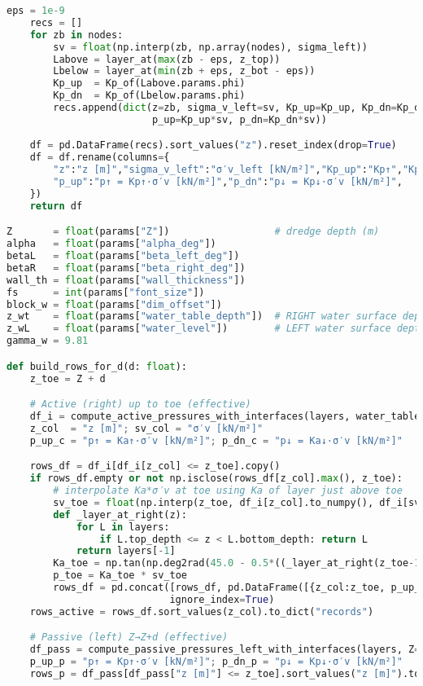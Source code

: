 \begin{lstlisting}[language=Python]
    eps = 1e-9
    recs = []
    for zb in nodes:
        sv = float(np.interp(zb, np.array(nodes), sigma_left))
        Labove = layer_at(max(zb - eps, z_top))
        Lbelow = layer_at(min(zb + eps, z_bot - eps))
        Kp_up  = Kp_of(Labove.params.phi)
        Kp_dn  = Kp_of(Lbelow.params.phi)
        recs.append(dict(z=zb, sigma_v_left=sv, Kp_up=Kp_up, Kp_dn=Kp_dn,
                         p_up=Kp_up*sv, p_dn=Kp_dn*sv))

    df = pd.DataFrame(recs).sort_values("z").reset_index(drop=True)
    df = df.rename(columns={
        "z":"z [m]","sigma_v_left":"σ′v_left [kN/m²]","Kp_up":"Kp↑","Kp_dn":"Kp↓",
        "p_up":"p↑ = Kp↑·σ′v [kN/m²]","p_dn":"p↓ = Kp↓·σ′v [kN/m²]",
    })
    return df

Z       = float(params["Z"])                  # dredge depth (m)
alpha   = float(params["alpha_deg"])
betaL   = float(params["beta_left_deg"])
betaR   = float(params["beta_right_deg"])
wall_th = float(params["wall_thickness"])
fs      = int(params["font_size"])
block_w = float(params["dim_offset"])
z_wt    = float(params["water_table_depth"])  # RIGHT water surface depth (for total water)
z_wL    = float(params["water_level"])        # LEFT water surface depth (for total water)
gamma_w = 9.81

def build_rows_for_d(d: float):
    z_toe = Z + d

    # Active (right) up to toe (effective)
    df_i = compute_active_pressures_with_interfaces(layers, water_table_depth=z_wt)
    z_col  = "z [m]"; sv_col = "σ′v [kN/m²]"
    p_up_c = "p↑ = Ka↑·σ′v [kN/m²]"; p_dn_c = "p↓ = Ka↓·σ′v [kN/m²]"

    rows_df = df_i[df_i[z_col] <= z_toe].copy()
    if rows_df.empty or not np.isclose(rows_df[z_col].max(), z_toe):
        # interpolate Ka*σ′v at toe using Ka of layer just above toe
        sv_toe = float(np.interp(z_toe, df_i[z_col].to_numpy(), df_i[sv_col].to_numpy()))
        def _layer_at_right(z):
            for L in layers:
                if L.top_depth <= z < L.bottom_depth: return L
            return layers[-1]
        Ka_toe = np.tan(np.deg2rad(45.0 - 0.5*((_layer_at_right(z_toe-1e-6).params.phi) or 0.0)))**2
        p_toe = Ka_toe * sv_toe
        rows_df = pd.concat([rows_df, pd.DataFrame([{z_col:z_toe, p_up_c:p_toe, p_dn_c:p_toe}])],
                            ignore_index=True)
    rows_active = rows_df.sort_values(z_col).to_dict("records")

    # Passive (left) Z→Z+d (effective)
    df_pass = compute_passive_pressures_left_with_interfaces(layers, Z=Z, t=d, water_table_depth=z_wt)
    p_up_p = "p↑ = Kp↑·σ′v [kN/m²]"; p_dn_p = "p↓ = Kp↓·σ′v [kN/m²]"
    rows_p = df_pass[df_pass["z [m]"] <= z_toe].sort_values("z [m]").to_dict("records")


\end{lstlisting}
